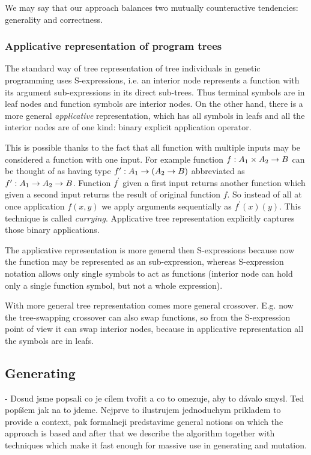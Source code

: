\documentclass{ws-ijait}
\begin{document}
We may say that our approach balances two mutually counteractive tendencies: generality and correctness. 


\subsubsection{Applicative representation of program trees}

The standard way of tree representation of tree individuals in genetic programming uses S-expressions,
i.e. an interior node represents a function with its argument sub-expressions in its direct sub-trees. 
Thus terminal symbols are in leaf nodes and function symbols are interior nodes.
On the other hand, there is a more general \textit{applicative} representation, which has all symbols in leafs and all the interior nodes are of one kind: binary explicit application operator.

This is possible thanks to the fact that all function with multiple inputs may be considered a function with one input. For example function $f : A_1 \times A_2 \rightarrow B$ can be thought of as having type $f^\prime : A_1 \rightarrow (A_2 \rightarrow B)$ abbreviated as $f^\prime : A_1 \rightarrow A_2 \rightarrow B$. Function $f^\prime$ given a first input returns another function which given a second input returns the result of original function $f$. So instead of all at once application $f(x,y)$ we apply arguments sequentially as $f^\prime(x)(y)$. This technique is called \textit{currying}. Applicative tree representation explicitly captures those binary applications.


The applicative representation is more general then S-expressions because now the function may be represented as an sub-expression, whereas S-expression notation allows only single symbols to act as functions (interior node can hold only a single function symbol, but not a whole expression).

With more general tree representation comes more general crossover. E.g. now the tree-swapping crossover can also swap functions, so from the S-expression point of view it can swap interior nodes, because in applicative representation all the symbols are in leafs.  

\subsection{Generating}

- Dosud jsme popsali co je cílem tvořit a co to omezuje, aby to dávalo smysl. Ted popíšem jak na to jdeme. Nejprve to ilustrujem jednoduchym prikladem to provide a context, pak formalneji predstavime general notions on which the approach is based and after that we describe the algorithm together with techniques which make it fast enough for massive use in generating and mutation.
\end{document}
